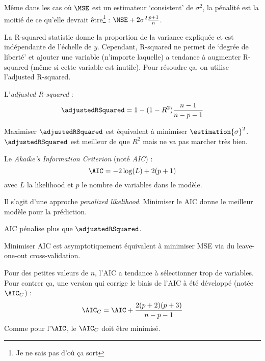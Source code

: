         Même dans les cas où \(\MSE\) est un estimateur `consistent' de \(\sigma^2\), la pénalité est la moitié de ce qu'elle devrait être\footnote{Je ne sais pas d'où ça sort} : \(\MSE + 2\sigma^2 \frac{p+1}{n}\).

        La R-squared statistic donne la proportion de la variance expliquée et est indépendante de l'échelle de \(y\). Cependant, R-squared ne permet de `degrée de liberté' et ajouter une variable (n'importe laquelle) a tendance à augmenter R-squared (même si cette variable est inutile). Pour résoudre ça, on utilise l'adjusted R-squared.

        \begin{definition}
            L'\textit{adjusted R-squared} :
            \[
                \adjustedRSquared = 1 - (1 - R^2) \frac{n-1}{n - p - 1}
            \]
        \end{definition}

        Maximiser \(\adjustedRSquared\) est équivalent à minimiser \(\estimation{\sigma}^2\). \(\adjustedRSquared\) est meilleur de que \(R^2\) mais ne va pas marcher très bien.

        \begin{definition}
            Le \textit{Akaike's Information Criterion} (noté \textit{AIC}) :
            \[
                \AIC = -2 \log(L) + 2(p+1)
            \]
            avec \(L\) la likelihood et \(p\) le nombre de variables dans le modèle.

            Il s'agit d'une approche \textit{penalized likelihood}. Minimiser le AIC donne le meilleur modèle pour la prédiction.

            AIC pénalise plus que \(\adjustedRSquared\).

            Minimiser AIC est asymptotiquement équivalent à minimiser MSE via du leave-one-out cross-validation.

            Pour des petites valeurs de \(n\), l'AIC a tendance à sélectionner trop de variables. Pour contrer ça, une version qui corrige le biais de l'AIC à été développé (notée \(\AIC_C\)) :
            \[
                \AIC_C = \AIC + \frac{2(p + 2)(p + 3)}{n - p - 1}
            \]
            Comme pour l'\(\AIC\), le \(\AIC_C\) doit être minimisé.
        \end{definition}

